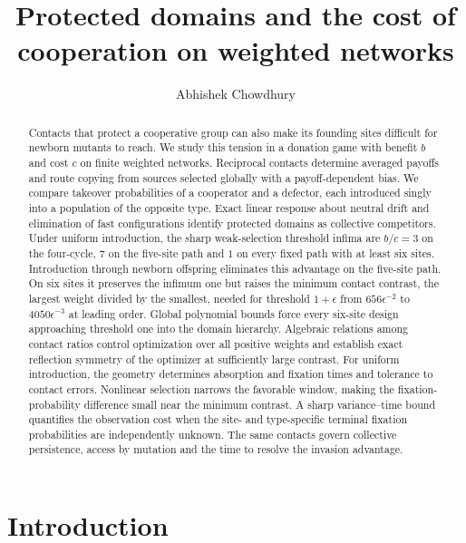 \documentclass[aps,pre,reprint,amsmath,amssymb,longbibliography]{revtex4-2}
\begin{document}
\title{Protected domains and the cost of cooperation on weighted networks}
\author{Abhishek Chowdhury}
\begin{abstract}

Contacts that protect a cooperative group can also make its founding sites
difficult for newborn mutants to reach. We study this tension in a donation
game with benefit $b$ and cost $c$ on finite weighted networks. Reciprocal
contacts determine averaged payoffs and route copying from sources selected
globally with a payoff-dependent bias. We compare takeover probabilities of
a cooperator and a defector, each introduced singly into a population of
the opposite type. Exact linear response about neutral drift and
elimination of fast configurations identify protected domains as collective
competitors. Under uniform introduction, the sharp weak-selection threshold
infima are $b/c=3$ on the four-cycle, $7$ on the five-site path and $1$ on
every fixed path with at least six sites. Introduction through newborn
offspring eliminates this advantage on the five-site path. On six sites it
preserves the infimum one but raises the minimum contact contrast, the
largest weight divided by the smallest, needed for threshold $1+\epsilon$
from $656\epsilon^{-2}$ to $4050\epsilon^{-3}$ at leading order. Global
polynomial bounds force every six-site design approaching threshold one
into the domain hierarchy. Algebraic relations among contact ratios control
optimization over all positive weights and establish exact reflection
symmetry of the optimizer at sufficiently large contrast. For uniform
introduction, the geometry determines absorption and fixation times and
tolerance to contact errors. Nonlinear selection narrows the favorable
window, making the fixation-probability difference small near the minimum
contrast. A sharp variance--time bound quantifies the observation cost when
the site- and type-specific terminal fixation probabilities are
independently unknown. The same contacts govern collective persistence,
access by mutation and the time to resolve the invasion advantage.
\end{abstract}
\maketitle



\section{Introduction}
\label{sec:intro}
\end{document}

